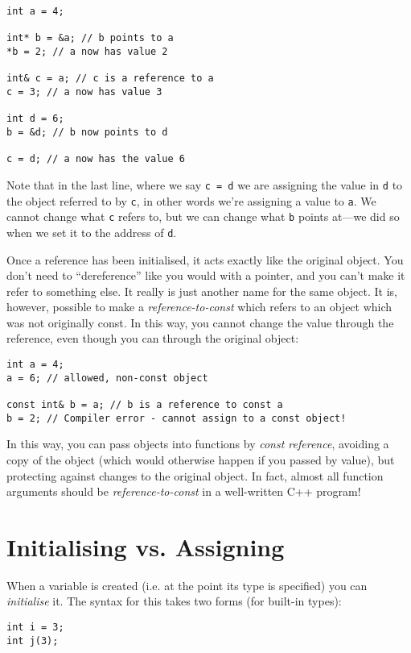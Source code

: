 \documentclass[a4paper]{scrartcl}
\begin{document}
\begin{verbatim}
int a = 4;

int* b = &a; // b points to a
*b = 2; // a now has value 2

int& c = a; // c is a reference to a
c = 3; // a now has value 3

int d = 6;
b = &d; // b now points to d

c = d; // a now has the value 6
\end{verbatim}

Note that in the last line, where we say \verb|c = d| we are assigning the value in \verb|d| to the object referred to by \verb|c|, in other words we're assigning a value to \verb|a|. We cannot change what \verb|c| refers to, but we can change what \verb|b| points at---we did so when we set it to the address of \verb|d|.

Once a reference has been initialised, it acts exactly like the original object. You don't need to ``dereference'' like you would with a pointer, and you can't make it refer to something else. It really is just another name for the same object. It is, however, possible to make a \emph{reference-to-const} which refers to an object which was not originally const. In this way, you cannot change the value through the reference, even though you can through the original object:

\begin{verbatim}
int a = 4;
a = 6; // allowed, non-const object

const int& b = a; // b is a reference to const a
b = 2; // Compiler error - cannot assign to a const object!
\end{verbatim}

In this way, you can pass objects into functions by \emph{const reference}, avoiding a copy of the object (which would otherwise happen if you passed by value), but protecting against changes to the original object. In fact, almost all function arguments should be \emph{reference-to-const} in a well-written C++ program!

\section{Initialising vs. Assigning}
When a variable is created (i.e. at the point its type is specified) you can \emph{initialise} it. The syntax for this takes two forms (for built-in types):
\begin{verbatim}
int i = 3;
int j(3);
\end{verbatim}
\end{document}
